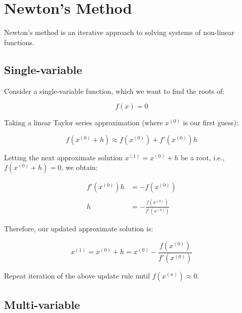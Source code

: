 \documentclass[12pt]{article}
\begin{document}
\pagebreak

\section{Newton's Method}

Newton's method is an iterative approach to solving systems of non-linear functions.

\subsection{Single-variable}

Consider a single-variable function, which we want to find the roots of:

\vspace{2mm}

$$f(x)=0$$

\vspace{2mm}

Taking a linear Taylor series approximation (where $x^{(0)}$ is our first guess):

\vspace{2mm}

$$f(x^{(0)} + h) \approx f(x^{(0)}) + f'(x^{(0)})h$$

\vspace{4mm}

Letting the next approximate solution $x^{(1)}=x^{(0)}+h$ be a root, i.e., $f(x^{(0)}+h)=0$, we obtain:

\vspace{2mm}

\begin{align*}
f'(x^{(0)})h &= -f(x^{(0)}) \\
\\
h &= -\frac{f(x^{(0)})}{f'(x^{(0)})}
\end{align*}

\vspace{4mm}

Therefore, our updated approximate solution is:

\vspace{2mm}

$$x^{(1)} = x^{(0)} + h = x^{(0)} - \frac{f(x^{(0)})}{f'(x^{(0)})}$$

\vspace{4mm}

Repeat iteration of the above update rule until $f(x^{(n)}) \approx 0$.

\subsection{Multi-variable}
\end{document}
